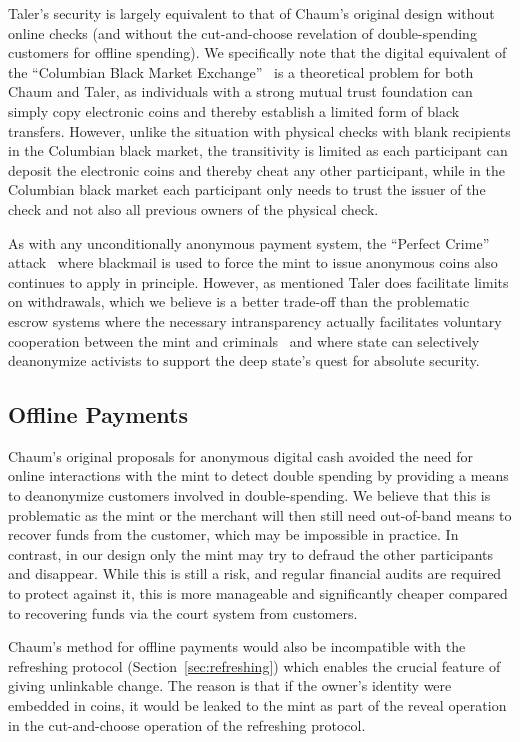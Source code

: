 \documentclass{llncs}
\begin{document}
Taler's security is largely equivalent to that of Chaum's original
design without online checks (and without the cut-and-choose
revelation of double-spending customers for offline spending).  We
specifically note that the digital equivalent of the ``Columbian Black
Market Exchange''~\cite{fatf1997} is a theoretical problem for both
Chaum and Taler, as individuals with a strong mutual trust foundation
can simply copy electronic coins and thereby establish a limited form
of black transfers.  However, unlike the situation with physical
checks with blank recipients in the Columbian black market, the
transitivity is limited as each participant can deposit the electronic
coins and thereby cheat any other participant, while in the Columbian
black market each participant only needs to trust the issuer of the
check and not also all previous owners of the physical check.

As with any unconditionally anonymous payment system, the ``Perfect
Crime'' attack~\cite{solms1992perfect} where blackmail is used to
force the mint to issue anonymous coins also continues to apply in
principle.  However, as mentioned Taler does facilitate limits on
withdrawals, which we believe is a better trade-off than the
problematic escrow systems where the necessary intransparency
actually facilitates voluntary cooperation between the mint and
criminals~\cite{sander1999escrow} and where state can selectively
deanonymize activists to support the deep state's quest for absolute
security.

\subsection{Offline Payments}

Chaum's original proposals for anonymous digital cash avoided the need
for online interactions with the mint to detect double spending by
providing a means to deanonymize customers involved in
double-spending.  We believe that this is problematic as the mint or
the merchant will then still need out-of-band means to recover funds
from the customer, which may be impossible in practice.  In contrast,
in our design only the mint may try to defraud the other participants
and disappear.  While this is still a risk, and regular financial
audits are required to protect against it, this is more manageable and
significantly cheaper compared to recovering funds via the court
system from customers.

Chaum's method for offline payments would also be incompatible with
the refreshing protocol (Section~\ref{sec:refreshing}) which enables
the crucial feature of giving unlinkable change.  The reason is that
if the owner's identity were embedded in coins, it would be leaked to
the mint as part of the reveal operation in the cut-and-choose
operation of the refreshing protocol.
\end{document}
